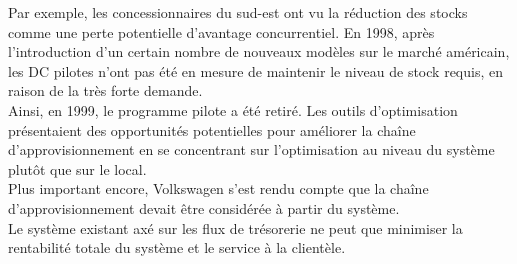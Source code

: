 \documentclass{ceri}
\begin{document}
Par exemple, les concessionnaires du sud-est ont vu la réduction des stocks comme une perte potentielle d'avantage concurrentiel. En 1998, après l'introduction d'un certain nombre de nouveaux modèles sur le marché américain, les DC pilotes n'ont pas été en mesure de maintenir le niveau de stock requis, en raison de la très forte demande.\\


Ainsi, en 1999, le programme pilote a été retiré. Les outils d'optimisation présentaient des opportunités potentielles pour améliorer la chaîne d'approvisionnement en se concentrant sur l'optimisation au niveau du système plutôt que sur le local. \\
Plus important encore, Volkswagen s'est rendu compte que la chaîne d'approvisionnement devait être considérée à partir du système. \\


Le système existant axé sur les flux de trésorerie ne peut que minimiser la rentabilité totale du système et le service à la clientèle. 
\end{document}
